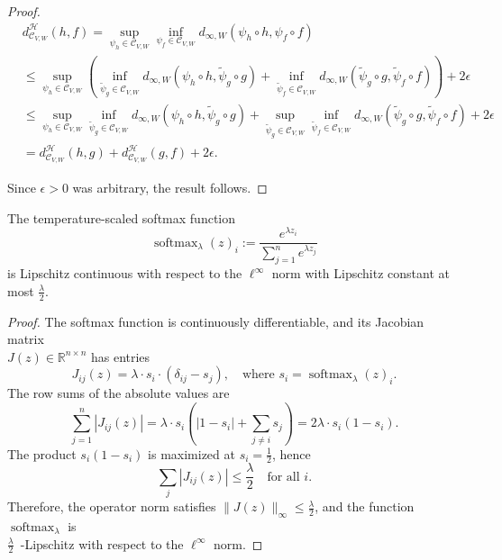\begin{proof}
\begin{align*}
&d^\mathcal{H}_{\mathcal{C}_{V,W}}(h,f) 
= \sup_{\psi_h \in \mathcal{C}_{V,W}} \inf_{\psi_f \in \mathcal{C}_{V,W}} d_{\infty,W}(\psi_h \circ h, \psi_f \circ f) \\
&\leq \sup_{\psi_h \in \mathcal{C}_{V,W}} \left( \inf_{\tilde{\psi}_g \in \mathcal{C}_{V,W}} d_{\infty,W}(\psi_h \circ h, \tilde{\psi}_g \circ g) + \inf_{\tilde{\psi}_f \in \mathcal{C}_{V,W}} d_{\infty,W}(\tilde{\psi}_g \circ g, \tilde{\psi}_f \circ f) \right) + 2\epsilon \\
&\leq \sup_{\psi_h \in \mathcal{C}_{V,W}} \inf_{\tilde{\psi}_g \in \mathcal{C}_{V,W}} d_{\infty,W}(\psi_h \circ h, \tilde{\psi}_g \circ g) 
+ \sup_{\tilde{\psi}_g \in \mathcal{C}_{V,W}} \inf_{\tilde{\psi}_f \in \mathcal{C}_{V,W}} d_{\infty,W}(\tilde{\psi}_g \circ g, \tilde{\psi}_f \circ f) 
+ 2\epsilon \\
&= d^\mathcal{H}_{\mathcal{C}_{V,W}}(h,g) + d^\mathcal{H}_{\mathcal{C}_{V,W}}(g,f) + 2\epsilon.
\end{align*}


Since \( \epsilon > 0 \) was arbitrary, the result follows.
\end{proof}



\begin{proposition}\label{prop:softmax_lip}
The temperature-scaled softmax function
\[
\operatorname{softmax}_\lambda(z)_i := \frac{e^{\lambda z_i}}{\sum_{j=1}^n e^{\lambda z_j}}
\]
is Lipschitz continuous with respect to the $\ell^\infty$ norm with Lipschitz constant at most $\frac{\lambda}{2}$.
\end{proposition}

\begin{proof}
The softmax function is continuously differentiable, and its Jacobian matrix \\ \(J(z) \in \mathbb{R}^{n \times n}\) has entries
\[
J_{ij}(z) = \lambda \cdot s_i \cdot (\delta_{ij} - s_j),
\quad \text{where } s_i = \operatorname{softmax}_\lambda(z)_i.
\]
The row sums of the absolute values are
\[
\sum_{j=1}^n |J_{ij}(z)| = \lambda \cdot s_i \left( |1 - s_i| + \sum_{j \ne i} s_j \right)
= 2\lambda \cdot s_i(1 - s_i).
\]
The product $s_i(1 - s_i)$ is maximized at $s_i = \frac{1}{2}$, hence
\[
\sum_j |J_{ij}(z)| \le \frac{\lambda}{2} \quad \text{for all } i.
\]
Therefore, the operator norm satisfies $\|J(z)\|_\infty \le \frac{\lambda}{2}$, and the function $\operatorname{softmax}_\lambda$ is \\ $\frac{\lambda}{2}$~-Lipschitz with respect to the $\ell^\infty$ norm.
\end{proof}


